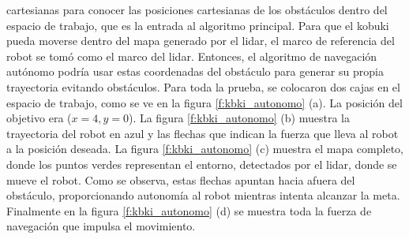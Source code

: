 cartesianas para conocer las posiciones cartesianas de los obstáculos dentro del espacio de 
trabajo, que es la entrada al algoritmo principal. Para que el kobuki pueda moverse dentro 
del mapa generado por el lidar, el marco de referencia del robot se tomó como el marco del 
lidar. Entonces, el algoritmo de navegación autónomo podría usar estas coordenadas del 
obstáculo para generar su propia trayectoria evitando obstáculos. Para toda la prueba, se 
colocaron dos cajas en el espacio de trabajo, como se ve en la figura \ref{f:kbki_autonomo} 
(a). La posición del objetivo era ($x = 4, y = 0$). La figura \ref{f:kbki_autonomo} (b) muestra 
la trayectoria del robot en azul y las flechas que indican la fuerza que lleva al robot a la 
posición deseada. La figura \ref{f:kbki_autonomo} (c) muestra el mapa completo, donde los puntos 
verdes representan el entorno, detectados por el lidar, donde se mueve el robot. Como se 
observa, estas flechas apuntan hacia afuera del obstáculo, proporcionando autonomía al robot 
mientras intenta alcanzar la meta. Finalmente en la figura \ref{f:kbki_autonomo} (d) se muestra 
toda la fuerza de navegación que impulsa el movimiento.


  

